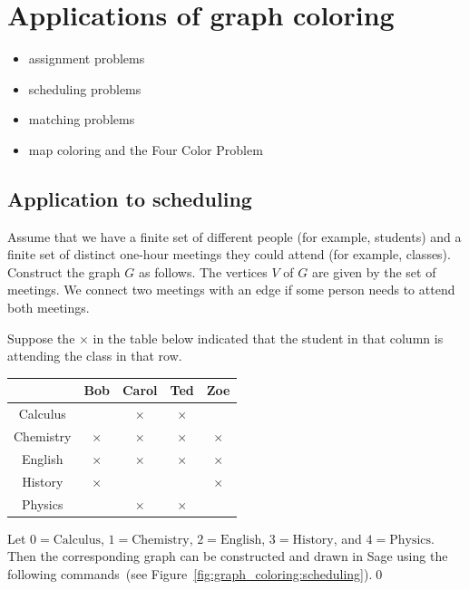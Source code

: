 

\section{Applications of graph coloring}

\begin{itemize}
\item assignment problems

\item scheduling problems

\item matching problems

\item map coloring and the Four Color Problem
\end{itemize}


\subsection{Application to scheduling}

Assume that we have a finite set of different people (for example, students)
and a finite set of distinct one-hour meetings they could attend (for example,
classes). Construct the
graph $G$ as follows. The vertices $V$ of $G$ are given by the set of
meetings. We connect two meetings with an edge if some person
needs to attend both meetings.

\begin{example}
\label{eg:coloring}
\rm
Suppose the $\times$ in the table below indicated that the student in
that column is attending the class in that row.

\begin{center}
\begin{tabular}{c|cccc}
          & Bob      & Carol    & Ted      & Zoe      \\\hline
Calculus  &          & $\times$ & $\times$ &          \\
Chemistry & $\times$ & $\times$ & $\times$ & $\times$ \\
English   & $\times$ & $\times$ & $\times$ & $\times$ \\
History   & $\times$ &          &          & $\times$ \\
Physics   &          & $\times$ & $\times$ &          \\\hline
\end{tabular}
\end{center}
Let $0 = \text{Calculus}$, $1 = \text{Chemistry}$,
$2 = \text{English}$, $3 = \text{History}$, and $4 = \text{Physics}$.
Then the corresponding graph can be constructed and drawn in Sage
using the following commands~(see
Figure~\ref{fig:graph_coloring:scheduling}).\qed
\end{example}

